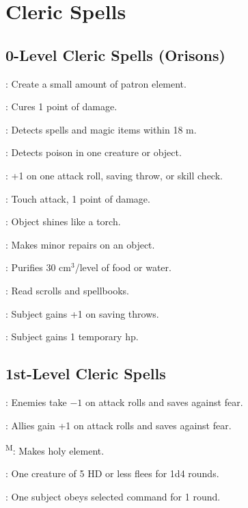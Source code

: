 \section{Cleric Spells}



\subsection{0-Level Cleric Spells (Orisons)}

: Create a small amount of patron element.

: Cures 1 point of damage.

: Detects spells and magic items within 18 m.

: Detects poison in one creature or object.

: +1 on one attack roll, saving throw, or skill check.

: Touch attack, 1 point of damage.

: Object shines like a torch.

: Makes minor repairs on an object.

: Purifies 30 cm$^3$/level of food or water.

: Read scrolls and spellbooks.

: Subject gains +1 on saving throws.

: Subject gains 1 temporary hp.



\subsection{1st-Level Cleric Spells}

: Enemies take $-1$ on attack rolls and saves against fear.

: Allies gain +1 on attack rolls and saves against fear.

\textsuperscript{M}: Makes holy element. %

: One creature of 5 HD or less flees for 1d4 rounds.

: One subject obeys selected command for 1 round.

